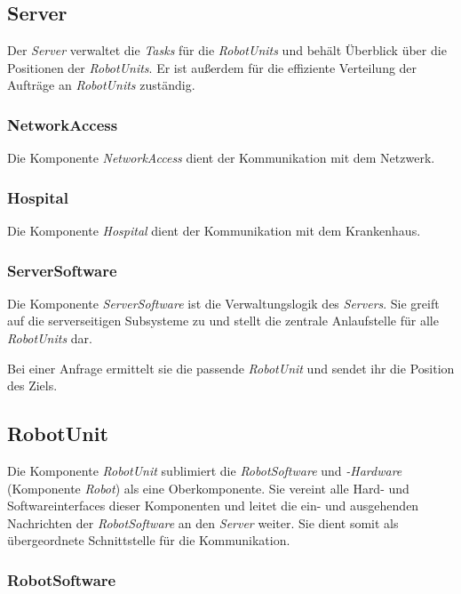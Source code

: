 \subsection{Server}

Der \emph{Server} verwaltet die \emph{Tasks} f\"{u}r die \emph{RobotUnits} und beh\"{a}lt \"{U}berblick \"{u}ber die Positionen der \emph{RobotUnits}. Er ist außerdem f\"{u}r die effiziente Verteilung der Auftr\"{a}ge an \emph{RobotUnits} zust\"{a}ndig.

\subsubsection{NetworkAccess}

Die Komponente \emph{NetworkAccess} dient der Kommunikation mit dem Netzwerk.

\subsubsection{Hospital}

Die Komponente \emph{Hospital} dient der Kommunikation mit dem Krankenhaus.

\subsubsection{ServerSoftware}

Die Komponente \emph{ServerSoftware} ist die Verwaltungslogik des \emph{Servers}. Sie greift auf die serverseitigen Subsysteme zu und stellt die zentrale Anlaufstelle f\"{u}r alle \emph{RobotUnits} dar.

Bei einer Anfrage ermittelt sie die passende \emph{RobotUnit} und sendet ihr die Position des Ziels.

\subsection{RobotUnit}

Die Komponente \emph{RobotUnit} sublimiert die \emph{RobotSoftware} und \emph{-Hardware} (Komponente \emph{Robot}) als eine Oberkomponente. Sie vereint alle Hard- und Softwareinterfaces dieser Komponenten und leitet die ein- und ausgehenden Nachrichten der \emph{RobotSoftware} an den \emph{Server} weiter. Sie dient somit als \"{u}bergeordnete Schnittstelle f\"{u}r die Kommunikation.

\subsubsection{RobotSoftware}

